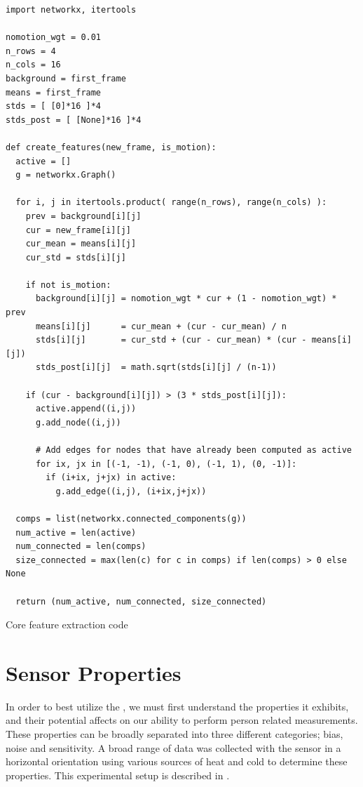 \documentclass[../thesis/thesis.tex]{subfiles}
\begin{document}
\begin{listing}
\centering
\begin{verbatim}
import networkx, itertools

nomotion_wgt = 0.01
n_rows = 4
n_cols = 16
background = first_frame
means = first_frame
stds = [ [0]*16 ]*4
stds_post = [ [None]*16 ]*4

def create_features(new_frame, is_motion):
  active = []
  g = networkx.Graph()

  for i, j in itertools.product( range(n_rows), range(n_cols) ):
    prev = background[i][j]
    cur = new_frame[i][j]
    cur_mean = means[i][j]
    cur_std = stds[i][j]

    if not is_motion:
      background[i][j] = nomotion_wgt * cur + (1 - nomotion_wgt) * prev
      means[i][j]      = cur_mean + (cur - cur_mean) / n
      stds[i][j]       = cur_std + (cur - cur_mean) * (cur - means[i][j])
      stds_post[i][j]  = math.sqrt(stds[i][j] / (n-1))

    if (cur - background[i][j]) > (3 * stds_post[i][j]):
      active.append((i,j))
      g.add_node((i,j))

      # Add edges for nodes that have already been computed as active
      for ix, jx in [(-1, -1), (-1, 0), (-1, 1), (0, -1)]:
        if (i+ix, j+jx) in active:
          g.add_edge((i,j), (i+ix,j+jx))

  comps = list(networkx.connected_components(g))
  num_active = len(active)
  num_connected = len(comps)
  size_connected = max(len(c) for c in comps) if len(comps) > 0 else None

  return (num_active, num_connected, size_connected)
\end{verbatim}
\caption{Core feature extraction code}
\label{lst:exps:featcode}
\end{listing}

\clearpage


\section{Sensor Properties}

In order to best utilize the \mlx, we must first understand the properties it exhibits, and their potential affects on our ability to perform person related measurements. These properties can be broadly separated into three different categories; bias, noise and sensitivity. A broad range of data was collected with the sensor in a horizontal orientation using various sources of heat and cold to determine these properties. This experimental setup is described in .
\end{document}
